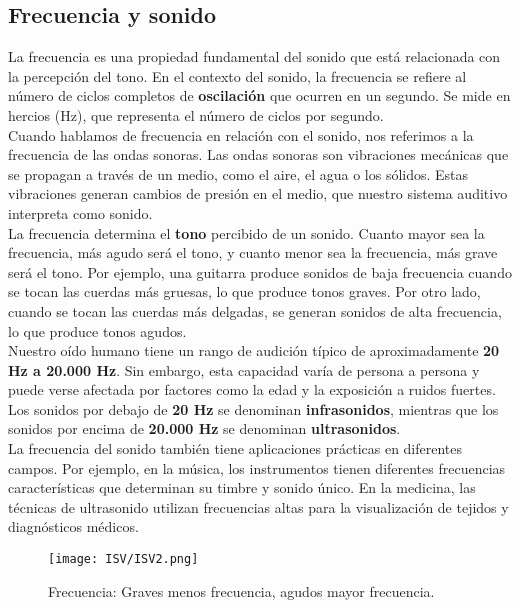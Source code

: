 \documentclass[
	12pt, %
	fleqn, %
	a4paper, %
	oneside, %
]{LegrandOrangeBook}
\begin{document}
\subsection{Frecuencia y sonido}
La frecuencia es una propiedad fundamental del sonido que está relacionada con la percepción del tono. En el contexto del sonido, la frecuencia se refiere al número de ciclos completos de \textbf{oscilación} que ocurren en un segundo. Se mide en hercios (Hz), que representa el número de ciclos por segundo.\\
Cuando hablamos de frecuencia en relación con el sonido, nos referimos a la frecuencia de las ondas sonoras. Las ondas sonoras son vibraciones mecánicas que se propagan a través de un medio, como el aire, el agua o los sólidos. Estas vibraciones generan cambios de presión en el medio, que nuestro sistema auditivo interpreta como sonido.\\
La frecuencia determina el \textbf{tono} percibido de un sonido. Cuanto mayor sea la frecuencia, más agudo será el tono, y cuanto menor sea la frecuencia, más grave será el tono. Por ejemplo, una guitarra produce sonidos de baja frecuencia cuando se tocan las cuerdas más gruesas, lo que produce tonos graves. Por otro lado, cuando se tocan las cuerdas más delgadas, se generan sonidos de alta frecuencia, lo que produce tonos agudos.\\
Nuestro oído humano tiene un rango de audición típico de aproximadamente \textbf{20 Hz a 20.000 Hz}. Sin embargo, esta capacidad varía de persona a persona y puede verse afectada por factores como la edad y la exposición a ruidos fuertes. Los sonidos por debajo de \textbf{20 Hz} se denominan \textbf{infrasonidos}, mientras que los sonidos por encima de \textbf{20.000 Hz} se denominan \textbf{ultrasonidos}.\\
La frecuencia del sonido también tiene aplicaciones prácticas en diferentes campos. Por ejemplo, en la música, los instrumentos tienen diferentes frecuencias características que determinan su timbre y sonido único. En la medicina, las técnicas de ultrasonido utilizan frecuencias altas para la visualización de tejidos y diagnósticos médicos.
\begin{figure}[H]
\centering
\texttt{[image: ISV/ISV2.png]}
\caption{Frecuencia: Graves menos frecuencia, agudos mayor frecuencia.}
\end{figure}
\end{document}
